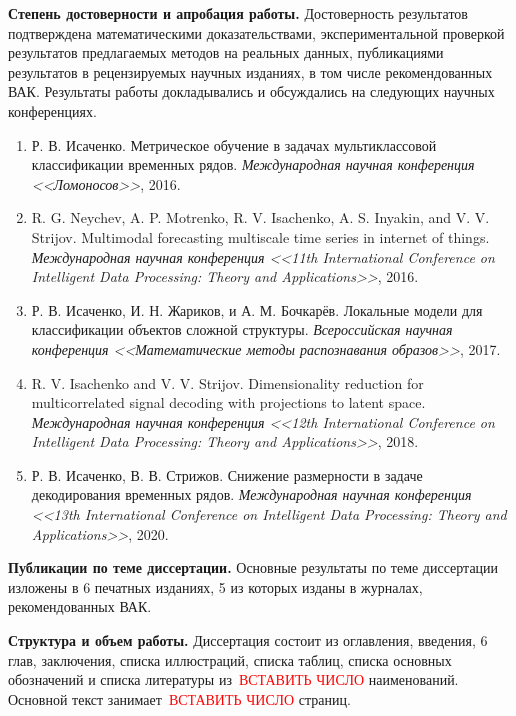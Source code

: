 \documentclass[11pt, a5paper]{dissert}
\begin{document}
\vspace{0.5cm}
\textbf{Степень достоверности и апробация работы.}
Достоверность результатов подтверждена математическими доказательствами, экспериментальной проверкой результатов предлагаемых методов на реальных данных, публикациями результатов в рецензируемых научных изданиях, в том числе рекомендованных ВАК. 
Результаты работы докладывались и обсуждались на следующих научных конференциях.
\begin{enumerate}
	\item Р. В. Исаченко. Метрическое обучение в задачах мультиклассовой классификации временных рядов. \textit{Международная научная конференция <<Ломоносов>>}, 2016.
	\item R. G. Neychev, A. P. Motrenko, R. V. Isachenko, A. S. Inyakin, and V. V. Strijov. Multimodal forecasting multiscale time series in internet of things. \textit{Международная научная конференция  <<11th International Conference on Intelligent Data Processing: Theory and Applications>>}, 2016.
	\item Р. В. Исаченко, И. Н. Жариков, и А. М. Бочкарёв. Локальные модели для классификации объектов сложной структуры. \textit{Всероссийская научная конференция <<Математические методы распознавания образов>>}, 2017.
	\item R. V. Isachenko and V. V. Strijov. Dimensionality reduction for multicorrelated signal decoding with projections to latent space. \textit{Международная научная конференция  <<12th International Conference on Intelligent Data Processing: Theory and Applications>>}, 2018.
	\item Р. В. Исаченко, В. В. Стрижов. Снижение размерности в задаче декодирования временных рядов. \textit{Международная научная конференция  <<13th International Conference on Intelligent Data Processing: Theory and Applications>>}, 2020.
\end{enumerate} 

\vspace{0.5cm}
\textbf{Публикации по теме диссертации.}
Основные результаты по теме диссертации изложены в 6 печатных изданиях, 5 из которых изданы в журналах, рекомендованных ВАК.

\vspace{0.5cm}
\textbf{Структура и объем работы.}
Диссертация состоит из оглавления, введения, 6 глав, заключения, списка иллюстраций, списка таблиц, списка основных обозначений и списка литературы из~\textcolor{red}{ВСТАВИТЬ ЧИСЛО} наименований. 
Основной текст занимает~\textcolor{red}{ВСТАВИТЬ ЧИСЛО} страниц.
\end{document}
